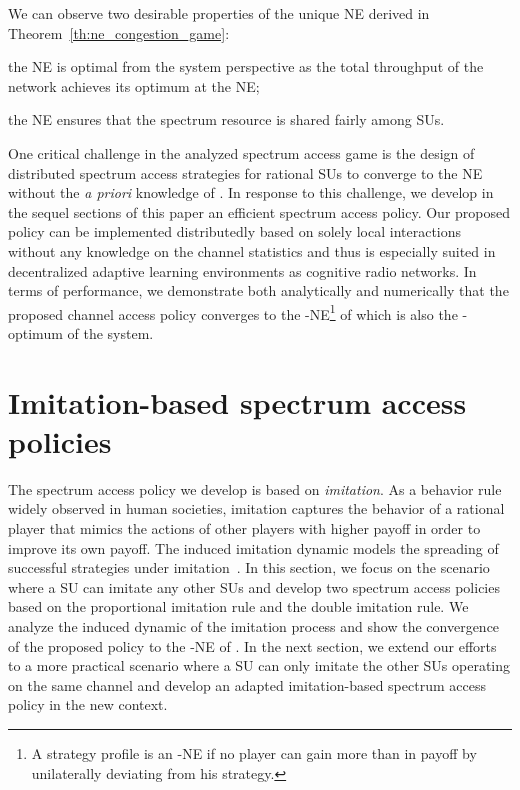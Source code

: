 \documentclass[12pt, onecolumn]{IEEEtran}
\theoremstyle{plain}
\theoremstyle{definition}
\begin{document}
We can observe two desirable properties of the unique NE derived in Theorem~\ref{th:ne_congestion_game}:

\begin{compactitem}
\item the NE is optimal from the system perspective as the total throughput of the network achieves its optimum at the NE;
\item the NE ensures that the spectrum resource is shared fairly among SUs.
\end{compactitem}

One critical challenge in the analyzed spectrum access game is the design of distributed spectrum access strategies for rational SUs to converge to the NE without the \textit{a priori} knowledge of . In response to this challenge, we develop in the sequel sections of this paper an efficient spectrum access policy. Our proposed policy can be implemented distributedly based on solely local interactions without any knowledge on the channel statistics and thus is especially suited in decentralized adaptive learning environments as cognitive radio networks. In terms of performance, we demonstrate both analytically and numerically that the proposed channel access policy converges to the -NE\footnote{A strategy profile is an -NE if no player can gain more than  in payoff by unilaterally deviating from his strategy.} of  which is also the -optimum of the system.

\section{Imitation-based spectrum access policies}
\label{sec:imitation}

The spectrum access policy we develop is based on \textit{imitation}. As a behavior rule widely observed in human societies, imitation captures the behavior of a rational player that mimics the actions of other players with higher payoff in order to improve its own payoff. The induced imitation dynamic models the spreading of successful strategies under imitation~\cite{Schlag96}. In this section, we focus on the scenario where a SU can imitate any other SUs and develop two spectrum access policies based on the proportional imitation rule and the double imitation rule. We analyze the induced dynamic of the imitation process and show the convergence of the proposed policy to the -NE of . In the next section, we extend our efforts to a more practical scenario where a SU can only imitate the other SUs operating on the same channel and develop an adapted imitation-based spectrum access policy in the new context.
\end{document}

